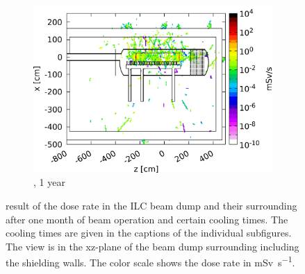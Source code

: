 \begin{figure}[htb]
\begin{subfigure}[b]{0.49\textwidth}
    \includegraphics[width=\textwidth]{Figures/BeamDump/Design1_5.png}
   \caption{\designone, 1 year}
   \end{subfigure} 
   \hfill
      \begin{minipage}{0.49\textwidth}
   \hfill
    \end{minipage}
    \caption[Dose rate in the ILC main beam dump \designone after cooling times]{\fluka result of the dose rate in the ILC beam dump \designone and their surrounding after one month of beam operation and certain cooling times.
   The cooling times are given in the captions of the individual subfigures.
   The view is in the xz-plane of the beam dump surrounding including the shielding walls.
   The color scale shows the dose rate in \si{\milli\sievert\per\second}.}
\end{figure}



